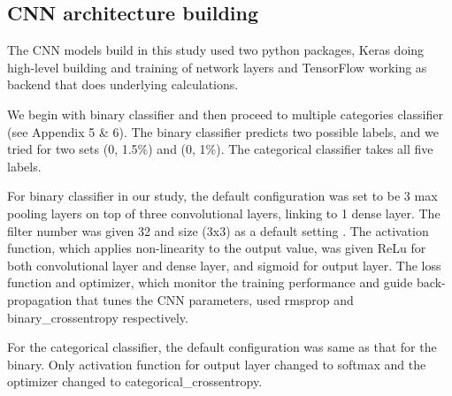 \documentclass[a4paper,12pt,oneside]{extarticle}
\begin{document}
\subsection{CNN architecture building}
The CNN models build in this study used two python packages, Keras \cite{37} doing high-level building and training of network layers and TensorFlow \cite{38} working as backend that does underlying calculations.
\par
We begin with binary classifier and then proceed to multiple categories classifier (see Appendix 5 \& 6). The binary classifier predicts two possible labels, and we tried for two sets (0, 1.5\%) and (0, 1\%). The categorical classifier takes all five labels.
\par
For binary classifier in our study, the default configuration was set to be 3 max pooling layers on top of three convolutional layers, linking to 1 dense layer. The filter number was given 32 and size (3x3) as a default setting \cite{39}. The activation function, which applies non-linearity to the output value, was given ReLu for both convolutional layer and dense layer, and sigmoid for output layer. The loss function and optimizer, which monitor the training performance and guide back-propagation that tunes the CNN parameters, used rmsprop and binary\_crossentropy respectively.
\par
For the categorical classifier, the default configuration was same as that for the binary. Only activation function for output layer changed to softmax and the optimizer changed to categorical\_crossentropy.
\end{document}
